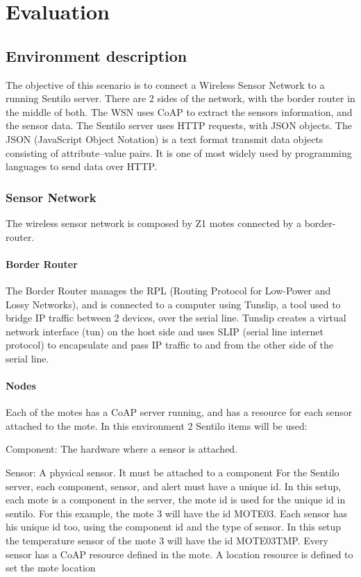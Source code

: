 \section{Evaluation}

\subsection{Environment description}

The objective of this scenario is to connect a Wireless Sensor Network to a running Sentilo server.
There are 2 sides of the network,
	with the border router in the middle of both.
The WSN uses CoAP to extract the sensors information,
	and the sensor data.
The Sentilo server uses HTTP requests,
	with JSON objects.
The JSON (JavaScript Object Notation) is a text format transmit data objects consisting of attribute–value pairs.
It is one of most widely used by programming languages to send data over HTTP.

\subsubsection{Sensor Network}
The wireless sensor network is composed by Z1 motes connected by a border-router.


\paragraph{Border Router}
The Border Router manages the RPL (Routing Protocol for Low-Power and Lossy Networks),
	and is connected to a computer using Tunslip,
	a tool used to bridge IP traffic between 2 devices,
	over the serial line.
Tunslip creates a virtual network interface (tun) on the host side and uses SLIP (serial line internet protocol) to encapsulate and pass IP traffic to and from the other side of the serial line.

\paragraph{Nodes}
Each of the motes has a CoAP server running,
	and has a resource for each sensor attached to the mote.
In this environment 2 Sentilo items will be used:

Component:
	The hardware where a sensor is attached.

Sensor:
	A physical sensor.
It must be attached to a component For the Sentilo server,
	each component,
	sensor,
	and alert must have a unique id.
In this setup,
	each mote is a component in the server,
	the mote id is used for the unique id in sentilo.
For this example,
	the mote 3 will have the id MOTE03.
Each sensor has his unique id too,
	using the component id and the type of sensor.
In this setup the temperature sensor of the mote 3 will have the id MOTE03TMP.
Every sensor has a CoAP resource defined in the mote.
A location resource is defined to set the mote location 

